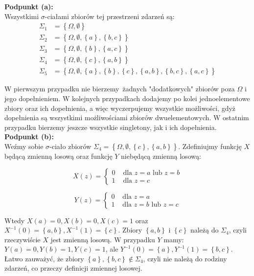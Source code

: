 \documentclass[a4paper,12pt]{article}
\newcommand{\set}[1]{\left \{ #1 \right \}}				%
\begin{document}
\noindent \textbf{Podpunkt (a):} \\
Wszystkimi $\sigma$-ciałami zbiorów tej przestrzeni zdarzeń są:
\begin{align*}
    \Sigma_1 &= \set{\Omega, \emptyset} \\
    \Sigma_2 &= \set{\Omega, \emptyset, \set{a}, \set{b, c}} \\
    \Sigma_3 &= \set{\Omega, \emptyset, \set{b}, \set{a, c}} \\
    \Sigma_4 &= \set{\Omega, \emptyset, \set{c}, \set{a, b}} \\
    \Sigma_5 &= \set{\Omega, \emptyset, \set{a}, \set{b}, 
        \set{c}, \set{a, b}, \set{b, c}, \set{a, c}}
\end{align*}

\noindent W pierwszym przypadku nie bierzemy żadnych "dodatkowych" zbiorów poza 
$\Omega$ i jego dopełnieniem. W kolejnych przypadkach dodajemy po kolei jednoelementowe
zbiory oraz ich dopełnienia, a więc wyczerpujemy wszystkie możliwości, gdyż dopełnienia
są wszystkimi możliwościami zbiorów dwuelementowych. W ostatnim przypadku bierzemy
jeszcze wszystkie singletony, jak i ich dopełnienia.\\

\noindent \textbf{Podpunkt (b):} \\
Weźmy sobie $\sigma$-ciało zbiorów $\Sigma_4 = \set{\Omega, \emptyset, 
\set{c}, \set{a, b}}$. Zdefiniujmy funkcję $X$ będącą zmienną losową oraz
funkcję $Y$ niebędącą zmienną losową:

\begin{minipage}{0.45\textwidth}
    \[
        X(z) = \begin{cases}
            0 & \text{ dla } z = a \text{ lub } z = b \\
            1 & \text{ dla } z = c
        \end{cases}  
    \]
\end{minipage}%
\begin{minipage}{0.45\textwidth}
    \[
        Y(z) = \begin{cases}
            0 & \text{ dla } z = a \\
            1 & \text{ dla } z = b \text{ lub } z = c
        \end{cases}  
    \]
\end{minipage}%

\noindent Wtedy $X(a) = 0, X(b) = 0, X(c) = 1$ oraz $X^{-1}(0) = \set{a, b}, 
X^{-1}(1) = \set{c}$. Zbiory $\set{a,b}$ i $\set{c}$ należą do $\Sigma_4$,
czyli rzeczywiście $X$ jest zmienną losową. W przypadku $Y$ mamy: $Y(a) = 0,
Y(b) = 1, Y(c) = 1$, ale $Y^{-1}(0) = \set{a}, Y^{-1}(1) = \set{b, c}$. Łatwo
zauważyć, że zbiory $\set{a}, \set{b,c} \notin \Sigma_4$, czyli nie należą do
rodziny zdarzeń, co przeczy definicji zmiennej losowej.
\end{document}
